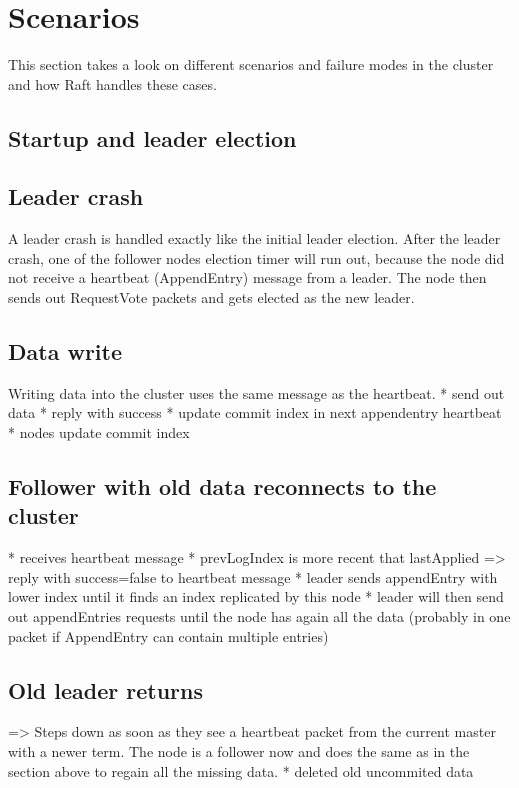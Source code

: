 \section{Scenarios}
This section takes a look on different scenarios and failure modes in the cluster and how Raft handles these cases.

\subsection{Startup and leader election}

\subsection{Leader crash}
A leader crash is handled exactly like the initial leader election.
After the leader crash, one of the follower nodes election timer will run out, because the node did not receive a heartbeat (AppendEntry) message from a leader. The node then sends out 
RequestVote packets and gets elected as the new leader.

\subsection{Data write}
Writing data into the cluster uses the same message as the heartbeat.
* send out data
* reply with success
* update commit index in next appendentry heartbeat
* nodes update commit index

\subsection{Follower with old data reconnects to the cluster}
* receives heartbeat message
* prevLogIndex is more recent that lastApplied => reply with success=false to heartbeat message
* leader sends appendEntry with lower index until it finds an index replicated by this node
* leader will then send out appendEntries requests until the node has again all the data (probably in one packet if AppendEntry can contain multiple entries)

\subsection{Old leader returns}
=> Steps down as soon as they see a heartbeat packet from the current master with a newer term.
The node is a follower now and does the same as in the section above to regain all the missing data.
* deleted old uncommited data

